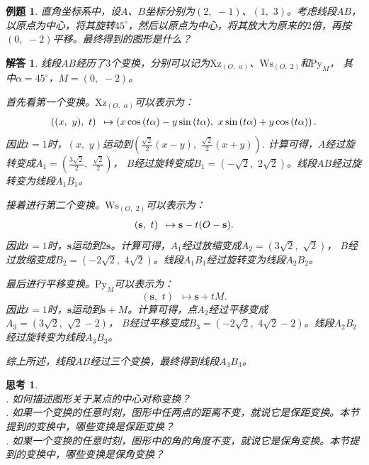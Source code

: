 \documentclass[12pt,UTF8]{ctexbook}
\newtheorem{et}{例题}[section]
\newtheorem{sk}{思考}[section]
\newtheorem*{so}{解答}
\begin{document}
\begin{et}
    直角坐标系中，设$A$、$B$坐标分别为$(2,\,\, -1)$、$(1,\,\, 3)$。考虑线段$AB$，
    以原点为中心，将其旋转$45^\circ$，然后以原点为中心，将其放大为原来的$2$倍，再按$(0,\,\, -2)$平移。最终得到的图形是什么？
\end{et}
\begin{so}
    线段$AB$经历了$3$个变换，分别可以记为$\mathrm{Xz}_{(O,\,\,\alpha)}$、$\mathrm{Ws}_{(O,\,\, 2)}$和$\mathrm{Py}_{M}$，
    其中$\alpha = 45^\circ$，$M = (0,\,\,-2)$。

    首先看第一个变换。$\mathrm{Xz}_{(O,\,\,\alpha)}$可以表示为：
    \begin{align}
        ((x,\,\,y),\,\, t) \,\,\, \mapsto \left(x\cos{(t\alpha)} - y\sin{(t\alpha)},\,\,x\sin{(t\alpha)} + y\cos{(t\alpha)}\right). \notag
    \end{align}
    因此$t=1$时，$(x,\,\,y)$运动到$\left(\frac{\sqrt{2}}{2}(x-y),\,\,\frac{\sqrt{2}}{2}(x+y)\right).$
    计算可得，$A$经过旋转变成$A_1 = \left(\frac{3\sqrt{2}}{2},\,\, \frac{\sqrt{2}}{2}\right)$，
    $B$经过旋转变成$B_1 = \left(-\sqrt{2},\,\, 2\sqrt{2}\right)$。线段$AB$经过旋转变为线段$A_1B_1$。

    接着进行第二个变换。$\mathrm{Ws}_{(O,\,\, 2)}$可以表示为：
    \begin{align}
        (\mathbf{s},\,\, t) \,\,\, \mapsto \mathbf{s} - t(O - \mathbf{s}). \notag
    \end{align}
    因此$t=1$时，$\mathbf{s}$运动到$2\mathbf{s}$。计算可得，$A_1$经过放缩变成$A_2 = \left(3\sqrt{2},\,\, \sqrt{2}\right)$，
    $B$经过放缩变成$B_2 = \left(-2\sqrt{2},\,\, 4\sqrt{2}\right)$。线段$A_1B_1$经过旋转变为线段$A_2B_2$。

    最后进行平移变换。$\mathrm{Py}_{M}$可以表示为：
    $$ (\mathbf{s},\,\, t) \,\,\, \mapsto \mathbf{s} + tM. $$
    因此$t=1$时，$\mathbf{s}$运动到$\mathbf{s} + M$。计算可得，点$A_2$经过平移变成$A_3 = \left(3\sqrt{2},\,\, \sqrt{2}-2\right)$，
    $B$经过平移变成$B_3 = \left(-2\sqrt{2},\,\, 4\sqrt{2}-2\right)$。线段$A_2B_2$经过旋转变为线段$A_3B_3$。

    综上所述，线段$AB$经过三个变换，最终得到线段$A_3B_3$。
\end{so}

\begin{sk}
    \mbox{}\\
    . 如何描述图形关于某点的中心对称变换？ \\
    . 如果一个变换的任意时刻，图形中任两点的距离不变，就说它是保距变换。本节提到的变换中，哪些变换是保距变换？\\
    . 如果一个变换的任意时刻，图形中的角的角度不变，就说它是保角变换。本节提到的变换中，哪些变换是保角变换？
\end{sk}
\end{document}
